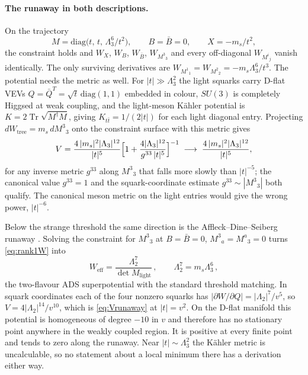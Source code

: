 \documentclass[12pt,a4paper]{article}
\begin{document}
\paragraph{The runaway in both descriptions.}
On the trajectory
\begin{equation}
\label{eq:runaway}
M = \mathrm{diag}\bigl(t,\,t,\,\Lambda_3^6/t^2\bigr),\qquad
B = \bar B = 0,\qquad X = -m_s/t^2,
\end{equation}
the constraint holds and $W_X$, $W_B$, $W_{\bar B}$, $W_{M^3{}_3}$ and
every off-diagonal $W_{M^i{}_j}$ vanish identically. The only surviving
derivatives are $W_{M^1{}_1} = W_{M^2{}_2} = -m_s\Lambda_3^6/t^3$.
The potential needs the metric as well. For $|t| \gg \Lambda_3^2$ the
light squarks carry D-flat VEVs $Q = \bar Q^{T} = \sqrt{t}\,
\mathrm{diag}(1,1)$ embedded in colour, $SU(3)$ is completely Higgsed
at weak coupling, and the light-meson K\"ahler potential is
$K = 2\operatorname{Tr}\sqrt{M^\dagger M}$, giving
$K_{t\bar t} = 1/(2|t|)$ for each light diagonal entry. Projecting
$dW_{\text{tree}} = m_s\,dM^3{}_3$ onto the constraint surface with this
metric gives
\begin{equation}
\label{eq:Vrunaway}
V = \frac{4\,|m_s|^2|\Lambda_3|^{12}}{|t|^5}
\Bigl[1 + \frac{4|\Lambda_3|^{12}}{g^{33}\,|t|^5}\Bigr]^{-1}
\;\longrightarrow\; \frac{4\,|m_s|^2|\Lambda_3|^{12}}{|t|^5},
\end{equation}
for any inverse metric $g^{33}$ along $M^3{}_3$ that falls more slowly
than $|t|^{-5}$; the canonical value $g^{33} = 1$ and the
squark-coordinate estimate $g^{33} \sim |M^3{}_3|$ both qualify.
The canonical meson metric on the light entries would give the wrong
power, $|t|^{-6}$.

Below the strange threshold the same direction is the
Affleck--Dine--Seiberg runaway \cite{ADS1984}. Solving the constraint for
$M^3{}_3$ at $B = \bar B = 0$, $M^3{}_a = M^a{}_3 = 0$ turns
\eqref{eq:rank1W} into
\begin{equation*}
W_{\text{eff}} = \frac{\Lambda_2^7}{\det M_{\text{light}}}\,,\qquad
\Lambda_2^7 = m_s\Lambda_3^6\,,
\end{equation*}
the two-flavour ADS superpotential with the standard threshold matching.
In squark coordinates each of the four nonzero squarks has
$|\partial W/\partial Q| = |\Lambda_2|^7/v^5$, so
$V = 4|\Lambda_2|^{14}/v^{10}$, which is \eqref{eq:Vrunaway} at
$|t| = v^2$. On the D-flat manifold this potential is homogeneous of
degree $-10$ in $v$ and therefore has no stationary point anywhere in
the weakly coupled region. It is positive at every finite point and
tends to zero along the runaway. Near $|t| \sim \Lambda_3^2$ the
K\"ahler metric is uncalculable, so no statement about a local minimum
there has a derivation either way.
\end{document}
